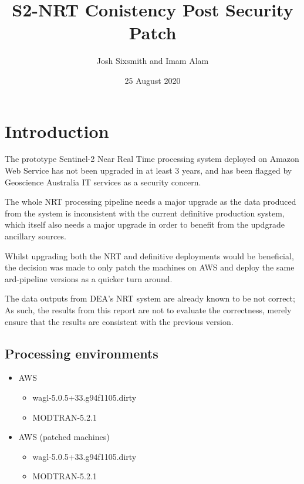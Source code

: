 \documentclass[a4paper]{article}
\title{S2-NRT Conistency Post Security Patch}
\date{25 August 2020}
\author{Josh Sixsmith and Imam Alam}
\begin{document}
  \maketitle
  \newpage

  \section{Introduction}

    \begin{flushleft}
      The prototype Sentinel-2 Near Real Time processing system deployed on Amazon Web Service has not been upgraded in at least 3 years, and has been flagged by Geoscience Australia IT services as a security concern. \par
      The whole NRT processing pipeline needs a major upgrade as the data produced from the system is inconsistent with the current definitive production system, which itself also needs a major upgrade in order to benefit from the updgrade ancillary sources. \par
      Whilst upgrading both the NRT and definitive deployments would be beneficial, the decision was made to only patch the machines on AWS and deploy the same ard-pipeline versions as a quicker turn around. \par
      The data outputs from DEA's NRT system are already known to be not correct; As such, the results from this report are not to evaluate the correctness, merely ensure that the results are consistent with the previous version.
    \end{flushleft}

    \subsection{Processing environments}
    \label{sec:environ}
      \begin{itemize}
        \item AWS
          \begin{itemize}
            \item wagl-5.0.5+33.g94f1105.dirty
            \item MODTRAN-5.2.1
          \end{itemize}
        \item AWS (patched machines)
          \begin{itemize}
            \item wagl-5.0.5+33.g94f1105.dirty
            \item MODTRAN-5.2.1
          \end{itemize}
      \end{itemize}
\end{document}
